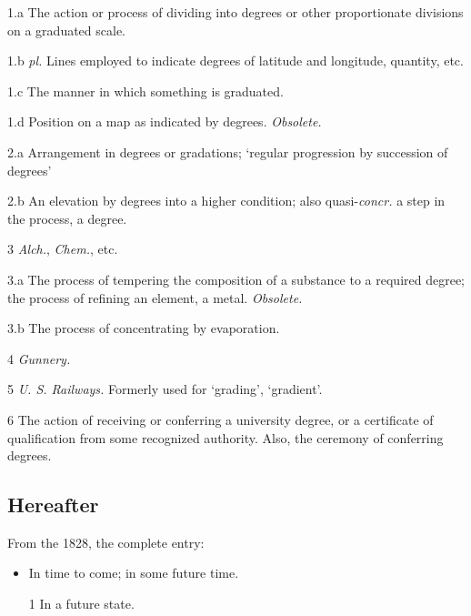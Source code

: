 			\begin{compactitem}
				\item[1.a] The action or process of dividing into degrees or other proportionate divisions on a graduated scale.
				\item[1.b] \textit{pl.} Lines employed to indicate degrees of latitude and longitude, quantity, etc.
				\item[1.c] The manner in which something is graduated.
				\item[1.d] Position on a map as indicated by degrees. \textit{Obsolete.}
				\item[2.a] Arrangement in degrees or gradations; `regular progression by succession of degrees'
				\item[2.b] An elevation by degrees into a higher condition; also quasi-\textit{concr.} a step in the process, a degree.
				\item[3] \textit{Alch.}, \textit{Chem.}, etc.
				\item[3.a] The process of tempering the composition of a substance to a required degree; the process of refining an element, a metal. \textit{Obsolete.}
				\item[3.b] The process of concentrating by evaporation.
				\item[4] \textit{Gunnery.}
				\item[5] \textit{U. S. Railways.} Formerly used for `grading', `gradient'.
				\item[6] The action of receiving or conferring a university degree, or a certificate of qualification from some recognized authority. Also, the ceremony of conferring degrees.
			\end{compactitem}


	\subsection{Hereafter} %
		\label{HEREAFTER}
		
		From the 1828, the complete entry:
		
			\begin{itemize}
				\item In time to come; in some future time.
				\item[1] In a future state.
			\end{itemize}

